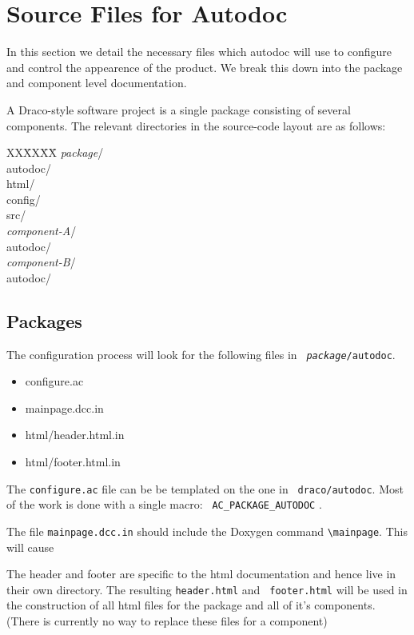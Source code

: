 \documentclass[memo]{ResearchNote}
\begin{document}
\section{Source Files for Autodoc}

In this section we detail the necessary files which autodoc will use
to configure and control the appearence of the product. We break this
down into the package and component level documentation.

A Draco-style software project is a single package consisting of
several components. The relevant directories in the source-code layout
are as follows:

\begin{tabbing}
XX\=XX\=XX\= \kill
{\em package}/ \\
\> autodoc/ \\
\> \> html/ \\
\> config/  \\
\> src/     \\
\> {\em component-A}/ \\
\> \> autodoc/    \\
\> {\em component-B}/ \\
\> \> autodoc/    \\
\end{tabbing}

\subsection{Packages}

The configuration process will look for the following files in {\tt
  {\em package}/autodoc}.

\begin{itemize}
\item configure.ac
\item mainpage.dcc.in
\item html/header.html.in
\item html/footer.html.in
\end{itemize}

The {\tt configure.ac} file can be be templated on the one in {\tt
  draco/autodoc}. Most of the work is done with a single macro: {\tt
  AC\_PACKAGE\_AUTODOC} .

The file {\tt mainpage.dcc.in} should include the Doxygen command
\verb=\mainpage=. This will cause 

The header and footer are specific to the html documentation and hence
live in their own directory. The resulting {\tt header.html} and {\tt
  footer.html} will be used in the construction of all html files for
the package and all of it's components. (There is currently no way to
replace these files for a component)
\end{document}
